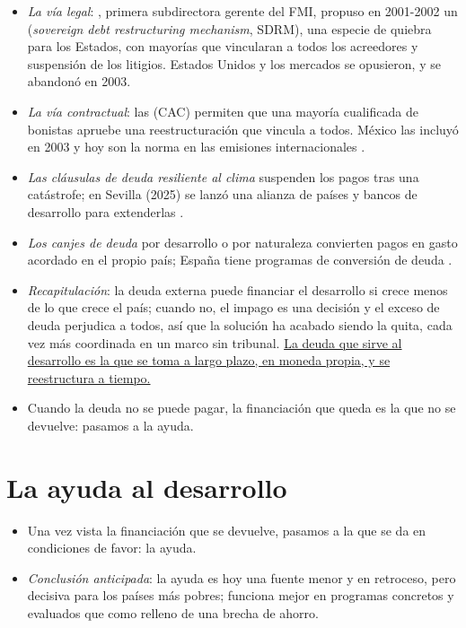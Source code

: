 \documentclass[11pt]{article}
\begin{document}
\begin{itemize}
\item \emph{La vía legal}: , primera subdirectora gerente del FMI, propuso en 2001-2002 un  (\emph{sovereign debt restructuring mechanism}, SDRM), una especie de quiebra para los Estados, con mayorías que vincularan a todos los acreedores y suspensión de los litigios\nocite{Krueger2002SDRM}. Estados Unidos y los mercados se opusieron, y se abandonó en 2003.
\item \emph{La vía contractual}: las  (CAC) permiten que una mayoría cualificada de bonistas apruebe una reestructuración que vincula a todos. México las incluyó en 2003 y hoy son la norma en las emisiones internacionales .
\item \emph{Las cláusulas de deuda resiliente al clima} suspenden los pagos tras una catástrofe; en Sevilla (2025) se lanzó una alianza de países y bancos de desarrollo para extenderlas\nocite{ONU2025FfD4Cierre} .
\item \emph{Los canjes de deuda} por desarrollo o por naturaleza convierten pagos en gasto acordado en el propio país; España tiene programas de conversión de deuda .
\end{itemize}

\begin{itemize}
\item \emph{Recapitulación}: la deuda externa puede financiar el desarrollo si crece menos de lo que crece el país; cuando no, el impago es una decisión y el exceso de deuda perjudica a todos, así que la solución ha acabado siendo la quita, cada vez más coordinada en un marco sin tribunal. \uline{La deuda que sirve al desarrollo es la que se toma a largo plazo, en moneda propia, y se reestructura a tiempo.}
\item Cuando la deuda no se puede pagar, la financiación que queda es la que no se devuelve: pasamos a la ayuda.
\end{itemize}

\section{La ayuda al desarrollo}\label{sec:ayuda}

\begin{itemize}
\item Una vez vista la financiación que se devuelve, pasamos a la que se da en condiciones de favor: la ayuda.
\item \emph{Conclusión anticipada}: la ayuda es hoy una fuente menor y en retroceso, pero decisiva para los países más pobres; funciona mejor en programas concretos y evaluados que como relleno de una brecha de ahorro.
\end{itemize}
\end{document}

